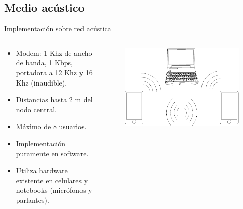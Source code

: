 \documentclass[aspectratio=169]{beamer}
\begin{document}
\subsection{Medio acústico}


\begin{frame}{Implementación sobre red \color{red}acústica}

\begin{columns}
  \begin{column}{0.50\textwidth}

\begin{itemize}
 \item Modem: 1 Khz de ancho de banda, 1 Kbps, portadora a 12 Khz y 16 Khz (inaudible).
 \item Distancias hasta 2 m del nodo central.
 \item Máximo de 8 usuarios.
 \item Implementación puramente en software.
 \item Utiliza hardware existente en celulares y notebooks (micrófonos y parlantes).
 \end{itemize}

  \end{column}
  \begin{column}{0.50\textwidth}

 
\begin{figure}[t]
  \centering
  \includegraphics[width=0.85 \textwidth]{../graphs/compucelus.pdf}
\end{figure}

  \end{column}
\end{columns}

\end{frame}
\end{document}
